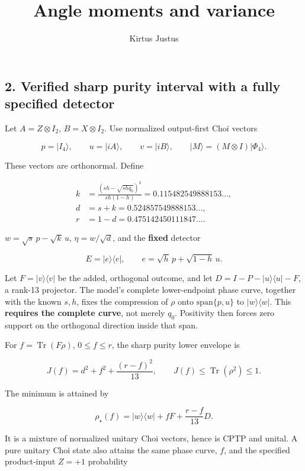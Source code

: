 \documentclass[
  10pt,
  a4paper,
]{article}
\title{Angle moments and variance}
\author{Kirtus Justus}
\date{}
\begin{document}
\maketitle

\subsection{2. Verified sharp purity interval with a fully specified detector}\label{verified-sharp-purity-interval-with-a-fully-specified-detector}

Let \(A=Z\otimes I_2\), \(B=X\otimes I_2\). Use normalized output-first Choi vectors

\[
 p=|I_4\rangle,\qquad u=|iA\rangle,\qquad v=|iB\rangle,
 \qquad |M\rangle=(M\otimes I)|\Phi_4\rangle.
\]

These vectors are orthonormal. Define

\[
\begin{aligned}
 k&=\frac{(sh-\sqrt{shq_0})^2}{sh(1-h)}=0.115482549888153\ldots,\\
 d&=s+k=0.524857549888153\ldots,\\
 r&=1-d=0.475142450111847\ldots.
\end{aligned}
\]

\(w=\sqrt{s}\,p-\sqrt{k}\,u\), \(\eta=w/\sqrt d\), and the \textbf{fixed} detector

\[
 E=|e\rangle\langle e|,\qquad e=\sqrt h\,p+\sqrt{1-h}\,u.
\]

Let \(F=|v\rangle\langle v|\) be the added, orthogonal outcome, and let \(D=I-P-|u\rangle\langle u|-F\), a rank-13 projector. The model's complete lower-endpoint phase curve, together with the known \(s,h\), fixes the compression of \(\rho\) onto \(\mathrm{span}\{p,u\}\) to \(|w\rangle\langle w|\). This \textbf{requires the complete curve}, not merely \(q_0\). Positivity then forces zero support on the orthogonal direction inside that span.

For \(f=\operatorname{Tr}(F\rho)\), \(0\le f\le r\), the sharp purity lower envelope is

\[
 \boxed{J(f)=d^2+f^2+\frac{(r-f)^2}{13}},\qquad
 \boxed{J(f)\le\operatorname{Tr}(\rho^2)\le1}.
\]

The minimum is attained by

\[
 \rho_\star(f)=|w\rangle\langle w|+fF+\frac{r-f}{13}D.
\]

It is a mixture of normalized unitary Choi vectors, hence is CPTP and unital. A pure unitary Choi state also attains the same phase curve, \(f\), and the specified product-input \(Z=+1\) probability
\end{document}
